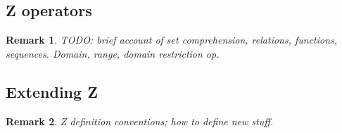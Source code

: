 \documentclass[12pt]{tufte-handout}
\numberwithin{equation}{subsection}
\numberwithin{equation}{subsection}
\newtheorem{remark}{Remark}
\begin{document}
\subsection{Z operators}
\label{subs:zops}

\begin{remark}
  TODO: brief account of set comprehension, relations, functions,
  sequences.  Domain, range, domain restriction op.
\end{remark}

\subsection{Extending Z}
\label{sect:zdefns}

\begin{remark}
  Z definition conventions; how to define new stuff.
\end{remark}
\end{document}
